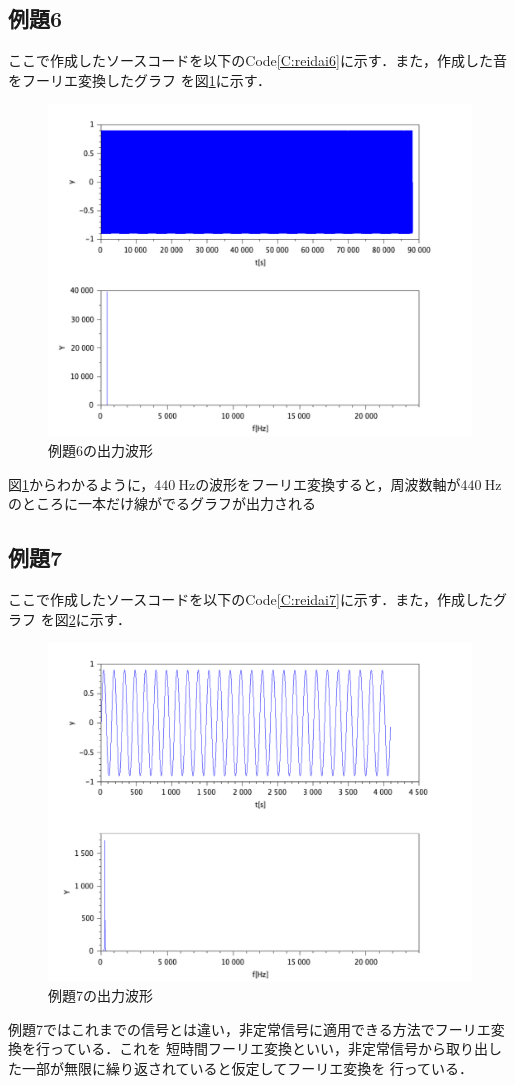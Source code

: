 \documentclass[a4paper,11pt]{jsarticle}
\begin{document}
\subsection{例題6}
ここで作成したソースコードを以下のCode\ref{C:reidai6}に示す．また，作成した音をフーリエ変換したグラフ
を図\ref{G:reidai6}に示す．

\begin{figure}[H]
  \centering
  \includegraphics[width=0.8\linewidth]{picture/reidai6.png}
  \caption{例題6の出力波形}
  \label{G:reidai6}
\end{figure}
図\ref{G:reidai6}からわかるように，$\SI{440}{\hertz}$の波形をフーリエ変換すると，周波数軸が$\SI{440}{\hertz}$
のところに一本だけ線がでるグラフが出力される

\subsection{例題7}
ここで作成したソースコードを以下のCode\ref{C:reidai7}に示す．また，作成したグラフ
を図\ref{G:reidai7}に示す．

\begin{figure}[H]
  \centering
  \includegraphics[width=0.8\linewidth]{picture/reidai7.png}
  \caption{例題7の出力波形}
  \label{G:reidai7}
\end{figure}
例題7ではこれまでの信号とは違い，非定常信号に適用できる方法でフーリエ変換を行っている．これを
短時間フーリエ変換といい，非定常信号から取り出した一部が無限に繰り返されていると仮定してフーリエ変換を
行っている．
\end{document}
